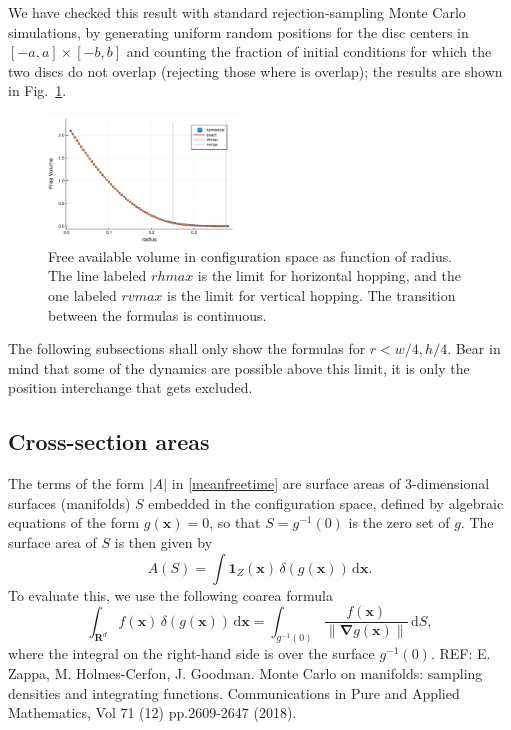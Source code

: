 \documentclass[superscriptaddress,pre,reprint,showpacs,twocolumn]{revtex4-1}
\newcommand{\indicatorsymbol}{\mathbf{1}}
\begin{document}
We have checked this result with standard rejection-sampling Monte Carlo simulations, 
by generating uniform random positions for the disc centers in 
$[-a,a] \times [-b,b]$ and 
counting the fraction of initial conditions for 
which the two discs do not overlap (rejecting those where is overlap); the results are shown in Fig.~\ref{VolMonteC}.



\begin{figure}[h]
\centering
\includegraphics[width=0.45\textwidth]{./figures/FreeVolume01.pdf}
\caption{Free available volume in configuration space as function of radius. The
  line labeled $rhmax$ is the limit for horizontal hopping, and the one labeled
  $rvmax$ is the limit for vertical hopping. The transition between the formulas
is continuous.}
\label{VolMonteC}%
\end{figure}


The following subsections shall only show the formulas for $r<w/4, h/4$.
Bear in mind that some of the dynamics are possible above this limit,
it is only the position interchange that gets excluded. \\



\subsection{Cross-section areas}\label{areahop}

The terms of the form $|A|$ in \eqref{meanfreetime} are surface areas of 3-dimensional surfaces (manifolds) $S$ embedded in the configuration space,
defined by algebraic equations of the form $g(\mathbf{x}) = 0$, so that $S = g^{-1}(0)$ is the zero set of $g$.
The surface area of $S$ is then given by
\begin{equation}
A(S) = \int \indicatorsymbol_Z(\mathbf{x}) \, \delta(g(\mathbf{x})) \, \mathrm{d} \mathbf{x}.
\label{eq:surface-area}
\end{equation}
To evaluate this, we use the following coarea formula
\cite[section 6.1]{Hormander83} 
\begin{equation}
\int_{\mathbf{R}^d} f(\mathbf{x}) \, \delta(g(\mathbf{x})) \, \mathrm{d} \mathbf{x} = \int_{g^{-1}(0)}\frac{f(\mathbf{x})}{\| \mathbf{\nabla}g(\mathbf{x}) \|} \, \mathrm{d}S,
\label{eq:surface-dirac}
\end{equation}
where the integral on the right-hand side is over the surface $g^{-1}(0)$.  
REF: E. Zappa, M. Holmes-Cerfon, J. Goodman. Monte Carlo on manifolds: sampling densities and integrating functions. Communications in Pure and Applied Mathematics, Vol 71 (12) pp.2609-2647 (2018).
\end{document}
